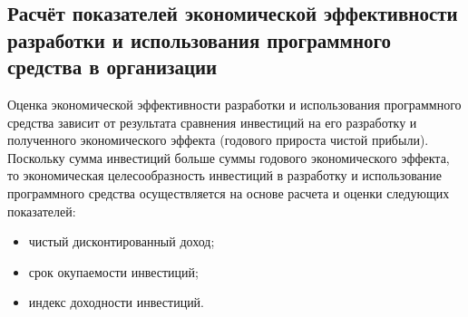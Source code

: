 \subsection{Расчёт показателей экономической эффективности разработки и использования программного средства в организации}
\label{sec:economics:efficiency}




Оценка экономической эффективности разработки и использования программного средства зависит от результата сравнения инвестиций на его разработку и полученного экономического эффекта (годового прироста чистой прибыли). Поскольку сумма инвестиций больше суммы годового экономического эффекта, то экономическая целесообразность инвестиций в разработку и использование программного средства осуществляется на основе расчета и оценки следующих показателей:

\begin{itemize}
    \item чистый дисконтированный доход;
    \item срок окупаемости инвестиций;
    \item индекс доходности инвестиций.
\end{itemize}

